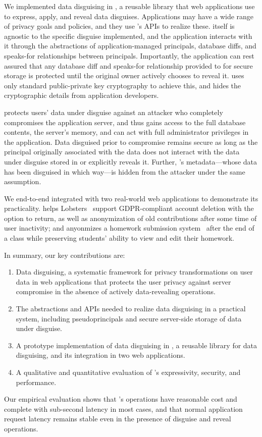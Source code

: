 %
We implemented data disguising in \sys, a reusable library that
web applications use to express, apply, and reveal data disguises.
%
Applications may have a wide range of privacy goals and policies, and they
use \sys's APIs to realize these.
%
\sys itself is agnostic to the specific disguise implemented, and the
application interacts with it through the abstractions of application-managed
principals, database diffs, and speaks-for relationships between principals.
%
Importantly, the application can rest assured that any database diff
and speaks-for relationship provided to \sys for secure storage is protected
until the original owner actively chooses to reveal it.
%
\sys uses only standard public-private key cryptography to achieve this, and
hides the cryptographic details from application developers.
%

%
%
\sys protects users' data under disguise against an attacker who completely
compromises the application server, and thus gains access to the full database
contents, the server's memory, and can act with full administrator privileges
in the application.
%
Data disguised prior to compromise remains secure as long as the principal
originally associated with the data does not interact with the data under
disguise stored in \sys or explicitly reveals it.
%
Further, \sys's metadata---\eg whose data has been disguised in which way---is
hidden from the attacker under the same assumption.
%

%
%
We end-to-end integrated \sys with two real-world web applications to demonstrate
its practicality.
%
\sys helps Lobsters~\cite{lobsters} support GDPR-compliant account deletion with
the option to return, as well as anonymization of old contributions after some
time of user inactivity; and \sys anyonmizes a homework submission
system~\cite{websubmit-rs-anon} after the end of a class while preserving
students' ability to view and edit their homework.
%

%
%
In summary, our key contributions are:
%
\begin{enumerate}[nosep]
 \item Data disguising, a systematic framework for privacy transformations on
   user data in web applications that protects the user privacy against server
   compromise in the absence of actively data-revealing operations.
 \item The abstractions and APIs needed to realize data disguising in a
  practical system, including pseudoprincipals and secure server-side storage
  of data under disguise.
 \item A prototype implementation of data disguising in \sys, a reusable
  library for data disguising, and its integration in two web applications.
 \item A qualitative and quantitative evaluation of \sys's expressivity,
  security, and performance.
\end{enumerate}
%
Our empirical evaluation shows that \sys's operations have reasonable cost
and complete with sub-second latency in most cases, and that normal application
request latency remains stable even in the presence of disguise and reveal
operations.
%

